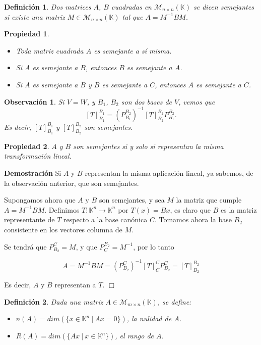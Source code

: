 \documentclass[12pt]{book}
\newtheorem{defi}{Definici\'on}
\newtheorem{prop}{Propiedad}
\newtheorem{obs}{Observaci\'on}
\def\K{\mathbb{K}}
\begin{document}
\begin{defi}
Dos matrices $A$, $B$ cuadradas en $\mathcal{M}_{n\times n}(\K)$ se dicen \emph{semejantes} si existe una matriz $M\in \mathcal{M}_{n\times n}(\K)$ tal que $A=M^{-1} B M$.
\end{defi}


\begin{prop}
\begin{itemize}
\item Toda matriz  cuadrada $A$ es semejante a sí misma.
\item Si $A$ es semejante a $B$, entonces $B$ es semejante a $A$.
\item Si $A$ es semejante a $B$ y $B$ es semejante a $C$, entonces $A$ es semejante a $C$.
\end{itemize}
\end{prop}

\begin{obs}
Si $V=W$, y $B_{1}$, $B_{2}$ son dos bases de $V$, vemos que 
$$ [T]_{B_{1}}^{B_{1}}=\left(P_{B_{1}}^{B_{2}}\right)^{-1} [T]_{B_{2}}^{B_{2}} P_{B_{1}}^{B_{2}}.$$
Es decir, $[T]_{B_{1}}^{B_{1}}$ y $[T]_{B_{2}}^{B_{2}}$ son semejantes.
\end{obs}

\begin{prop}
$A$ y $B$ son semejantes si y solo si representan la misma transformación lineal.
\end{prop}
{\bf Demostración}
Si $A$ y $B$ representan la misma aplicación lineal, ya sabemos, de la observación anterior, que son semejantes.

Supongamos ahora que $A$ y $B$ son semejantes, y sea $M$ la matriz que cumple $A=M^{-1}BM$.
Definimos $T:\K^n\rightarrow \K^n$ por $T(x)=Bx$, es claro que $B$ es la matriz representante de $T$ respecto a la base canónica $C$. Tomamos ahora la base $B_2$ consistente en los vectores columna de $M$.

Se tendrá que $P_{B_2}^C=M$, y que $P_C^{B_2}=M^{-1}$, por lo tanto 

$$A=M^{-1}BM=\left(P_{B_{2}}^{C}\right)^{-1} [T]_{C}^{C} P_{B_{2}}^{C}=[T]_{B_{2}}^{B_{2}}$$

Es decir, $A$ y $B$ representan a $T$.
\hfill $\Box$


\begin{defi}
Dada una matriz $A\in\mathcal{M}_{m\times n}(\K)$, se define:
\begin{itemize}
\item $n(A)=dim(\{x\in\K^n\ |\ Ax=0\})$, la nulidad de $A$.
\item $R(A)=dim(\{Ax\ |\ x\in\K^n\})$, el rango de $A$.
\end{itemize}
\end{defi}
\end{document}
